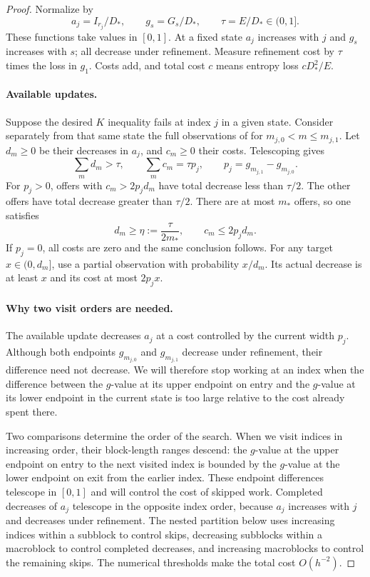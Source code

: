 \begin{proof}
Normalize by
\[
 a_j=I_{r_j}/D_*,\qquad g_s=G_s/D_*,\qquad\tau=E/D_*\in(0,1].
\]
These functions take values in $[0,1]$. At a fixed state $a_j$ increases
with $j$ and $g_s$ increases with $s$; all decrease under refinement.
Measure refinement cost by $\tau$ times the loss in $g_1$. Costs add, and
total cost $c$ means entropy loss $cD_*^2/E$.

\paragraph{Available updates.}
Suppose the desired $K$ inequality fails at index $j$ in a given state.
Consider separately from that same state the full observations of
 for $m_{j,0}<m\le m_{j,1}$.
Let $d_m\ge0$ be their decreases in $a_j$, and $c_m\ge0$ their costs.
Telescoping  gives
\[
 \sum_m d_m>\tau,\qquad\sum_m c_m=\tau p_j,\qquad
 p_j=g_{m_{j,1}}-g_{m_{j,0}}.
\]
For $p_j>0$, offers with $c_m>2p_jd_m$ have total decrease less than
$\tau/2$. The other offers have total decrease greater than $\tau/2$.
There are at most $m_*$ offers, so one satisfies
\begin{equation}
 d_m\ge\eta:=\frac{\tau}{2m_*},\qquad c_m\le2p_jd_m.
 \label{entropy-refinement:offer}
\end{equation}
If $p_j=0$, all costs are zero and the same conclusion follows.
For any target $x\in(0,d_m]$, use a partial observation with probability
$x/d_m$. Its actual decrease is at least $x$ and its cost at most $2p_jx$.

\paragraph{Why two visit orders are needed.}
The available update decreases $a_j$ at a cost controlled by the current
width $p_j$. Although both endpoints $g_{m_{j,0}}$ and $g_{m_{j,1}}$
decrease under refinement, their difference need not decrease. We will
therefore stop working at an index when the difference between the
$g$-value at its upper endpoint on entry and the $g$-value at its lower
endpoint in the current state is too large relative to the cost already
spent there.

Two comparisons determine the order of the search. When we visit indices in increasing order,
their block-length ranges descend: the $g$-value at the upper endpoint on
entry to the next visited index is bounded by the $g$-value at the lower
endpoint on exit from the earlier index.
These endpoint differences telescope in $[0,1]$ and will control the cost
of skipped work. Completed decreases of $a_j$ telescope in the opposite
index order, because $a_j$ increases with $j$ and decreases under
refinement. The nested partition below uses increasing indices within a
subblock to control skips, decreasing subblocks within a macroblock to
control completed decreases, and increasing macroblocks to control the
remaining skips. The numerical thresholds make the total cost
$O(h^{-2})$.


\end{proof}
